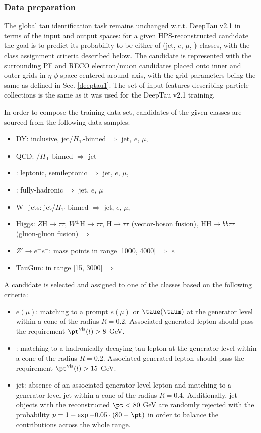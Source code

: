 \subsubsection{Data preparation}
The global tau identification task remains unchanged w.r.t. DeepTau v2.1 in terms of the input and output spaces: for a given HPS-reconstructed \tauh candidate the goal is to predict its probability to be either of (jet, $e$, $\mu$, \tauh) classes, with the class assignment criteria described below. The \tauh candidate is represented with the surrounding PF and RECO electron/muon candidates placed onto inner and outer grids in $\eta$-$\phi$ space centered around \tauh axis, with the grid parameters being the same as defined in Sec. \ref{deeptau1}. The set of input features describing particle collections is the same as it was used for the DeepTau v2.1 training.

In order to compose the training data set, \tauh candidates of the given classes are sourced from the following data samples:
\begin{itemize} \label{v2.5:datagroups}
    \item DY: inclusive, jet/$H_\text{T}$-binned $\Rightarrow$ jet, $e$, $\mu$, \tauh
    \item QCD: \pt/$H_\text{T}$-binned $\Rightarrow$ jet
    \item \ttbar: leptonic, semileptonic $\Rightarrow$ jet, $e$, $\mu$, \tauh
    \item \ttbar: fully-hadronic $\Rightarrow$ jet, $e$, $\mu$
    \item W+jets: jet/$H_\text{T}$-binned $\Rightarrow$ jet, $e$, $\mu$, \tauh
    \item Higgs: $Z \text{H}\to \tau\tau$, $W^\pm \text{H}\to \tau\tau$, $\text{H}\to \tau\tau$ (vector-boson fusion), $\text{H}\text{H}\to bb\tau\tau$ (gluon-gluon fusion) $\Rightarrow$ \tauh
    \item $Z' \to e^+e^-$: mass points in range [1000, 4000] $\Rightarrow$ $e$  
    \item TauGun: \pt in range [15, 3000] $\Rightarrow$ \tauh
\end{itemize}

A \tauh candidate is selected and assigned to one of the classes based on the following criteria:
\begin{itemize}
    \item $e (\mu)$: matching to a prompt $e (\mu)$ or $\taue (\taum)$ at the generator level within a cone of the radius $R=0.2$. Associated generated lepton should pass the requirement $\pt^{\text{vis}}(l)>8$ GeV.
    \item \tauh: matching to a hadronically decaying tau lepton at the generator level within a cone of the radius $R=0.2$. Associated generated lepton should pass the requirement $\pt^{\text{vis}}(l)>15$ GeV.
    \item jet: absence of an associated generator-level lepton and matching to a generator-level jet within a cone of the radius $R=0.4$. Additionally, jet objects with the reconstructed $\pt < 80$ GeV are randomly rejected with the probability $p = 1 - \exp{-0.05\cdot(80-\pt)}$ in order to balance the contributions across the whole \pt range.
\end{itemize}


